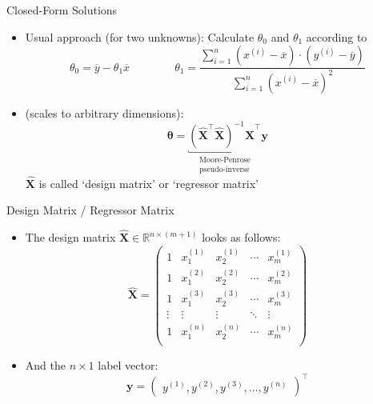 \begin{frame}{Closed-Form Solutions}{}
	\begin{itemize}
		\item Usual approach (for two unknowns): Calculate $\theta_0$ and $\theta_1$ according to
		\begin{equation}
			\theta_0 = \overline{y} - \theta_1 \overline{x} \qquad\qquad
			\theta_1 = \frac{\sum_{i=1}^n (x^{(i)} - \overline{x}) \cdot
				(y^{(i)} - \overline{y})}{\sum_{i=1}^n (x^{(i)} - \overline{x})^2}
		\end{equation}
		\item {} (scales to arbitrary dimensions):
		\begin{equation}
			\bm{\theta} = \underbracket{
				(\bm{\widehat{X}}^{\intercal} \bm{\widehat{X}})^{-1} \bm{\widehat{X}}^{\intercal}
			}_{\substack{\text{Moore-Penrose} \\ \text{pseudo-inverse}}} \bm{y}
		\end{equation}
		$\bm{\widehat{X}}$ is called `design matrix' or `regressor matrix'
	\end{itemize}
\end{frame}


\begin{frame}{Design Matrix / Regressor Matrix}{}
	\begin{itemize}
		\item The design matrix $\bm{\widehat{X}} \in \mathbb{R}^{n \times (m + 1)}$ looks as follows:
		\footnotesize
		\begin{equation}
			\bm{\widehat{X}} =
			\begin{pmatrix}
  				1 & x_1^{(1)} & x_2^{(1)} & \cdots & x_m^{(1)} \\
				1 & x_1^{(2)} & x_2^{(2)} & \cdots & x_m^{(2)} \\
				1 & x_1^{(3)} & x_2^{(3)} & \cdots & x_m^{(3)} \\
				\vdots & \vdots & \vdots & \ddots & \vdots \\
				1 & x_1^{(n)} & x_2^{(n)} & \cdots & x_m^{(n)} \\
 			\end{pmatrix}
		\end{equation}
		\normalsize
		\item And the $n \times 1$ label vector:
		\footnotesize
		\begin{equation*}
			 \bm{y} =
			 \begin{pmatrix}
				y^{(1)}, y^{(2)}, y^{(3)}, \dots, y^{(n)}
			\end{pmatrix}^{\intercal}
		\end{equation*}
	\end{itemize}
\end{frame}


